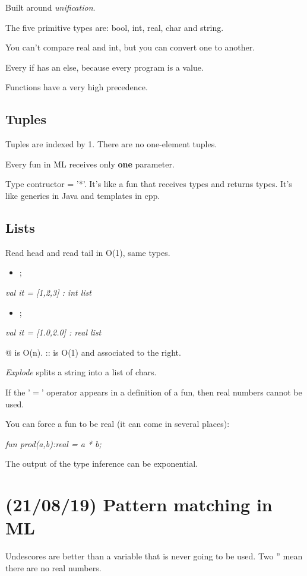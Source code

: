 \documentclass[11pt]{article}
\begin{document}
Built around \emph{unification}.

The five primitive types are: bool, int, real, char and string.

You can't compare real and int, but you can convert one to another.

Every if has an else, because every program is a value.

Functions have a very high precedence.

\subsection{Tuples}
\label{sec:orgfa96d18}
Tuples are indexed by 1. There are no one-element tuples.

Every fun in ML receives only \textbf{one} parameter.

Type contructor = '*'. It's like a fun that receives types and returns types. It's like
generics in Java and templates in cpp.

\subsection{Lists}
\label{sec:orge9bedc1}
Read head and read tail in O(1), same types.
\begin{itemize}
\item\relax [1,2,3];
\end{itemize}
\emph{val it = [1,2,3] : int list}
\begin{itemize}
\item\relax [1.0,2.0];
\end{itemize}
\emph{val it = [1.0,2.0] : real list}

@ is O(n). :: is O(1) and associated to the right.

\emph{Explode} splits a string into a list of chars.

If the '\(=\)' operator appears in a definition of a fun, then real numbers cannot be used.

You can force a fun to be real (it can come in several places):

\emph{fun prod(a,b):real = a * b;}

The output of the type inference can be exponential.
\section{(21/08/19) Pattern matching in ML}
\label{sec:orgac4ea14}
Undescores are better than a variable that is never going to be used.
Two '' mean there are no real numbers.
\end{document}
